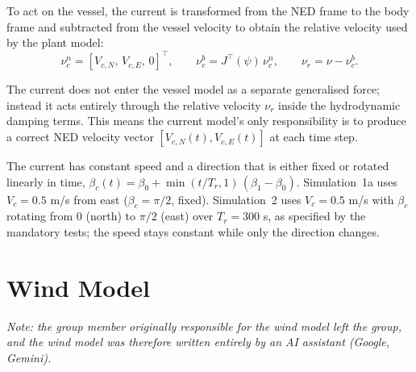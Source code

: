 \documentclass[10pt,conference]{IEEEtran}
\begin{document}
To act on the vessel, the current is transformed from the NED frame to
the body frame and subtracted from the vessel velocity to obtain the
relative velocity used by the plant model:
\begin{equation}
\nu_c^n = [V_{c,N},\, V_{c,E},\, 0]^\top, \qquad
\nu_c^b = J^\top(\psi)\,\nu_c^n, \qquad
\nu_r = \nu - \nu_c^b.
\label{eq:current}
\end{equation}

The current does not enter the vessel model as a separate generalised
force; instead it acts entirely through the relative velocity
$\nu_r$ inside the hydrodynamic damping terms. This means the current
model's only responsibility is to produce a correct NED velocity
vector $[V_{c,N}(t), V_{c,E}(t)]$ at each time step.

The current has constant speed and a direction that is either fixed
or rotated linearly in time,
$\beta_c(t)=\beta_0+\min(t/T_r,1)\,(\beta_1-\beta_0)$. Simulation~1a
uses $V_c=0.5$ m/s from east ($\beta_c=\pi/2$, fixed). Simulation~2
uses $V_c=0.5$ m/s with $\beta_c$ rotating from $0$ (north) to
$\pi/2$ (east) over $T_r=300$ s, as specified by the mandatory tests;
the speed stays constant while only the direction changes.

\section{Wind Model}
\label{sec:wind}

\emph{Note: the group member originally responsible for the wind
model left the group, and the wind model was therefore written
entirely by an AI assistant (Google, Gemini).}
\end{document}

